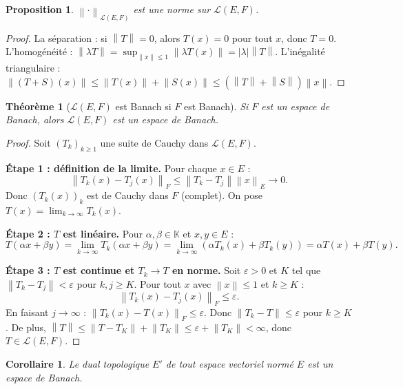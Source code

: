 \documentclass[a4paper,12pt]{book}
\newcommand{\K}{\mathbb{K}}
\newcommand{\norm}[1]{\left\| #1 \right\|}
\newcommand{\abs}[1]{\left| #1 \right|}
\theoremstyle{definition}
\theoremstyle{plain}
\newtheorem{theoreme}[definition]{Théorème}
\newtheorem{proposition}[definition]{Proposition}
\newtheorem{corollaire}[definition]{Corollaire}
\theoremstyle{remark}
\begin{document}
\begin{proposition}\label{prop:norme-op-est-norme}
$\norm{\cdot}_{\mathcal{L}(E,F)}$ est une norme sur $\mathcal{L}(E,F)$.
\end{proposition}

\begin{proof}
La séparation : si $\norm{T} = 0$, alors $T(x) = 0$ pour tout $x$, donc $T = 0$. L'homogénéité : $\norm{\lambda T} = \sup_{\norm{x}\leq 1}\norm{\lambda T(x)} = \abs{\lambda}\norm{T}$. L'inégalité triangulaire : $\norm{(T+S)(x)} \leq \norm{T(x)} + \norm{S(x)} \leq (\norm{T} + \norm{S})\norm{x}$.
\end{proof}

\begin{theoreme}[$\mathcal{L}(E,F)$ est Banach si $F$ est Banach]\label{thm:L-banach}
Si $F$ est un espace de Banach, alors $\mathcal{L}(E,F)$ est un espace de Banach.
\end{theoreme}

\begin{proof}
Soit $(T_k)_{k\geq 1}$ une suite de Cauchy dans $\mathcal{L}(E,F)$.

\textbf{Étape 1 : définition de la limite.} Pour chaque $x \in E$ :
\[
    \norm{T_k(x) - T_j(x)}_F \leq \norm{T_k - T_j}\norm{x}_E \to 0.
\]
Donc $(T_k(x))_k$ est de Cauchy dans $F$ (complet). On pose $T(x) = \lim_{k\to\infty} T_k(x)$.

\textbf{Étape 2 : $T$ est linéaire.} Pour $\alpha, \beta \in \K$ et $x, y \in E$ :
\[
    T(\alpha x + \beta y) = \lim_{k\to\infty} T_k(\alpha x + \beta y) = \lim_{k\to\infty} (\alpha T_k(x) + \beta T_k(y)) = \alpha T(x) + \beta T(y).
\]

\textbf{Étape 3 : $T$ est continue et $T_k \to T$ en norme.} Soit $\varepsilon > 0$ et $K$ tel que $\norm{T_k - T_j} < \varepsilon$ pour $k, j \geq K$. Pour tout $x$ avec $\norm{x} \leq 1$ et $k \geq K$ :
\[
    \norm{T_k(x) - T_j(x)}_F \leq \varepsilon.
\]
En faisant $j \to \infty$ : $\norm{T_k(x) - T(x)}_F \leq \varepsilon$. Donc $\norm{T_k - T} \leq \varepsilon$ pour $k \geq K$. De plus, $\norm{T} \leq \norm{T - T_K} + \norm{T_K} \leq \varepsilon + \norm{T_K} < \infty$, donc $T \in \mathcal{L}(E,F)$.
\end{proof}

\begin{corollaire}\label{cor:dual-banach}
Le dual topologique $E'$ de tout espace vectoriel normé $E$ est un espace de Banach.
\end{corollaire}
\end{document}
